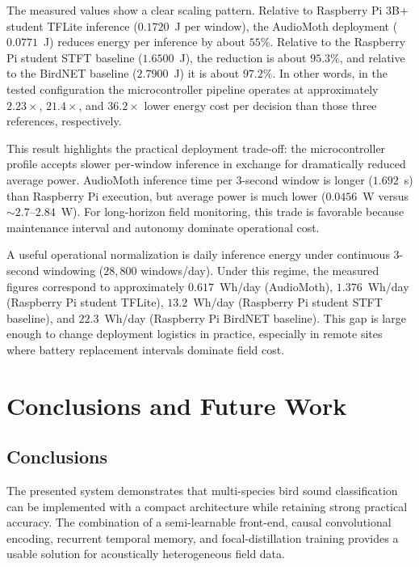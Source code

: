 \documentclass[a4paper,singleside,12pt]{report} %
\begin{document}
	The measured values show a clear scaling pattern. Relative to Raspberry Pi 3B+ student TFLite inference (\(0.1720\)~J per window), the AudioMoth deployment (\(0.0771\)~J) reduces energy per inference by about \(55\%\). Relative to the Raspberry Pi student STFT baseline (\(1.6500\)~J), the reduction is about \(95.3\%\), and relative to the BirdNET baseline (\(2.7900\)~J) it is about \(97.2\%\). In other words, in the tested configuration the microcontroller pipeline operates at approximately \(2.23\times\), \(21.4\times\), and \(36.2\times\) lower energy cost per decision than those three references, respectively.

	This result highlights the practical deployment trade-off: the microcontroller profile accepts slower per-window inference in exchange for dramatically reduced average power. AudioMoth inference time per 3-second window is longer (\(1.692\)~s) than Raspberry Pi execution, but average power is much lower (\(0.0456\)~W versus \(\sim2.7\)--\(2.84\)~W). For long-horizon field monitoring, this trade is favorable because maintenance interval and autonomy dominate operational cost.

	A useful operational normalization is daily inference energy under continuous 3-second windowing (\(28{,}800\) windows/day). Under this regime, the measured figures correspond to approximately \(0.617\)~Wh/day (AudioMoth), \(1.376\)~Wh/day (Raspberry Pi student TFLite), \(13.2\)~Wh/day (Raspberry Pi student STFT baseline), and \(22.3\)~Wh/day (Raspberry Pi BirdNET baseline). This gap is large enough to change deployment logistics in practice, especially in remote sites where battery replacement intervals dominate field cost.

	\chapter{Conclusions and Future Work}
	\section{Conclusions}
		\begin{sloppypar}
		The presented system demonstrates that multi-species bird sound classification can be implemented with a compact architecture while retaining strong practical accuracy. The combination of a semi-learnable front-end, causal convolutional encoding, recurrent temporal memory, and focal-distillation training provides a usable solution for acoustically heterogeneous field data.
		\end{sloppypar}
\end{document}
